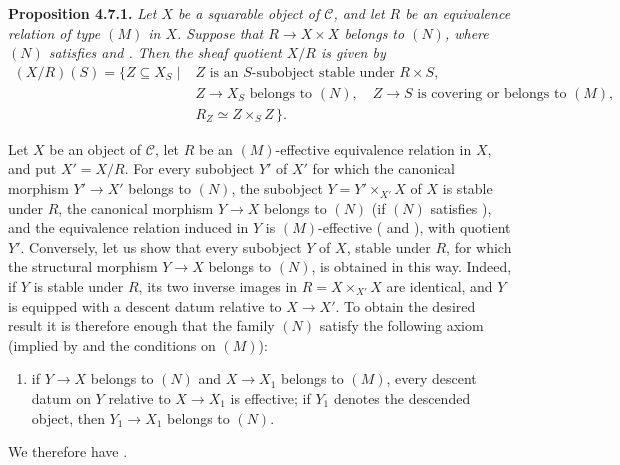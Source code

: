 \medskip
\noindent{}\textbf{Proposition 4.7.1.}
\textit{Let \(X\) be a squarable object of \(\mathscr C\), and let \(R\)
be an equivalence relation of type \((M)\) in \(X\). Suppose that
\(R\to X\times X\) belongs to \((N)\), where \((N)\) satisfies  and
. Then the sheaf quotient \(X/R\) is given by}
\[
\begin{aligned}
 (X/R)(S)=\{Z\subseteq X_S\mid{}&
   Z\text{ is an }S\text{-subobject stable under }R\times S,\\
 & Z\to X_S\text{ belongs to }(N),\quad
   Z\to S\text{ is covering or belongs to }(M),\\
 & R_Z\simeq Z\times_S Z\,\}.
\end{aligned}
\]

Let \(X\) be an object of \(\mathscr C\), let \(R\) be an \((M)\)-effective
equivalence relation in \(X\), and put \(X'=X/R\). For every subobject
\(Y'\) of \(X'\) for which the canonical morphism \(Y'\to X'\) belongs to
\((N)\), the subobject \(Y=Y'\times_{X'}X\) of \(X\) is stable under \(R\),
the canonical morphism \(Y\to X\) belongs to \((N)\) (if \((N)\) satisfies
), and the equivalence relation induced in \(Y\) is
\((M)\)-effective ( and ), with quotient \(Y'\). Conversely,
let us show that every subobject \(Y\) of \(X\), stable under \(R\), for
which the structural morphism \(Y\to X\) belongs to \((N)\), is obtained in
this way. Indeed, if \(Y\) is stable under \(R\), its two inverse images in
\(R=X\times_{X'}X\) are identical, and \(Y\) is equipped with a descent datum
relative to \(X\to X'\). To obtain the desired result it is therefore enough
that the family \((N)\) satisfy the following axiom (implied by
 and the conditions on \((M)\)):
\begin{enumerate}
  \item[\((f_M)\)] if \(Y\to X\) belongs to \((N)\) and
    \(X\to X_1\) belongs to \((M)\), every descent datum on \(Y\)
    relative to \(X\to X_1\) is effective; if \(Y_1\) denotes the
    descended object, then \(Y_1\to X_1\) belongs to \((N)\).
\end{enumerate}
We therefore have .


